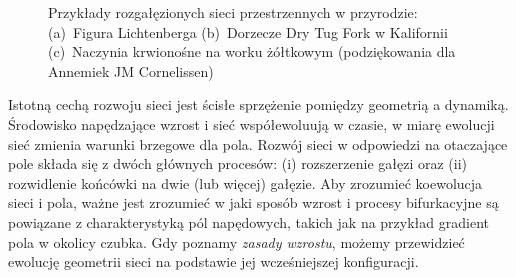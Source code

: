 \documentclass[]{pracamgr}
\begin{document}
\begin{figure}[H]
      \quad
      \caption{Przykłady rozgałęzionych sieci przestrzennych w przyrodzie: (a)~Figura Lichtenberga \cite{paulslab} (b)~Dorzecze Dry Tug Fork w Kalifornii \cite{ball2009branches} (c)~Naczynia krwionośne na worku żółtkowym \cite{Clement2017tissue} (podziękowania dla Annemiek JM Cornelissen)}
      \label{networks_in_nature}
    \end{figure}
 
      Istotną cechą rozwoju sieci jest ścisłe sprzężenie pomiędzy geometrią a dynamiką. Środowisko napędzające wzrost i sieć współewoluują w czasie, w miarę ewolucji sieć zmienia warunki brzegowe dla pola. Rozwój sieci w odpowiedzi na otaczające pole składa się z dwóch głównych procesów: (i) rozszerzenie gałęzi oraz (ii) rozwidlenie końcówki na dwie (lub więcej) gałęzie. Aby zrozumieć koewolucja sieci i pola, ważne jest  zrozumieć w jaki sposób wzrost i procesy bifurkacyjne są powiązane z charakterystyką pól napędowych, takich jak na przykład gradient pola w okolicy czubka. Gdy poznamy \textit{zasady wzrostu}, możemy przewidzieć ewolucję geometrii sieci na podstawie jej wcześniejszej konfiguracji. \par
      
\end{document}

